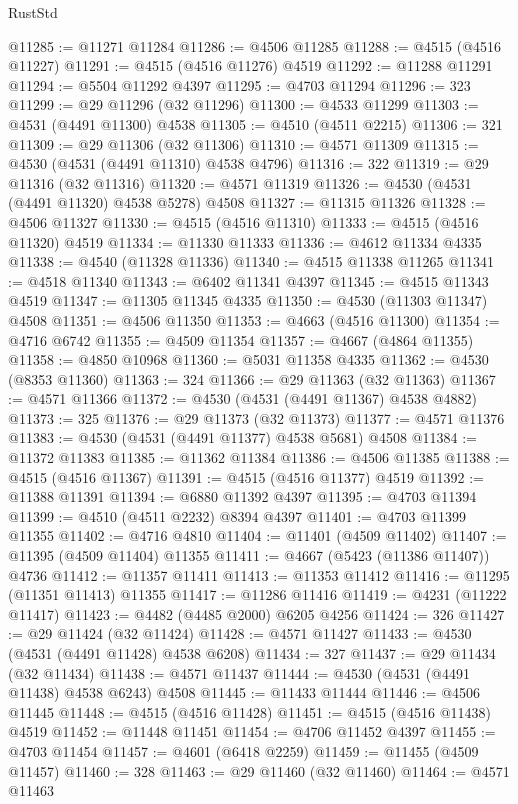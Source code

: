 \begin{lexlean}{RustStd}
\begin{coremodule}
@11285 := @11271 @11284
@11286 := @4506 @11285
@11288 := @4515 (@4516 @11227)
@11291 := @4515 (@4516 @11276) @4519
@11292 := @11288 @11291
@11294 := @5504 @11292 @4397
@11295 := @4703 @11294
@11296 := 323
@11299 := @29 @11296 (@32 @11296)
@11300 := @4533 @11299
@11303 := @4531 (@4491 @11300) @4538
@11305 := @4510 (@4511 @2215)
@11306 := 321
@11309 := @29 @11306 (@32 @11306)
@11310 := @4571 @11309
@11315 := @4530 (@4531 (@4491 @11310) @4538 @4796)
@11316 := 322
@11319 := @29 @11316 (@32 @11316)
@11320 := @4571 @11319
@11326 := @4530 (@4531 (@4491 @11320) @4538 @5278) @4508
@11327 := @11315 @11326
@11328 := @4506 @11327
@11330 := @4515 (@4516 @11310)
@11333 := @4515 (@4516 @11320) @4519
@11334 := @11330 @11333
@11336 := @4612 @11334 @4335
@11338 := @4540 (@11328 @11336)
@11340 := @4515 @11338 @11265
@11341 := @4518 @11340
@11343 := @6402 @11341 @4397
@11345 := @4515 @11343 @4519
@11347 := @11305 @11345 @4335
@11350 := @4530 (@11303 @11347) @4508
@11351 := @4506 @11350
@11353 := @4663 (@4516 @11300)
@11354 := @4716 @6742
@11355 := @4509 @11354
@11357 := @4667 (@4864 @11355)
@11358 := @4850 @10968
@11360 := @5031 @11358 @4335
@11362 := @4530 (@8353 @11360)
@11363 := 324
@11366 := @29 @11363 (@32 @11363)
@11367 := @4571 @11366
@11372 := @4530 (@4531 (@4491 @11367) @4538 @4882)
@11373 := 325
@11376 := @29 @11373 (@32 @11373)
@11377 := @4571 @11376
@11383 := @4530 (@4531 (@4491 @11377) @4538 @5681) @4508
@11384 := @11372 @11383
@11385 := @11362 @11384
@11386 := @4506 @11385
@11388 := @4515 (@4516 @11367)
@11391 := @4515 (@4516 @11377) @4519
@11392 := @11388 @11391
@11394 := @6880 @11392 @4397
@11395 := @4703 @11394
@11399 := @4510 (@4511 @2232) @8394 @4397
@11401 := @4703 @11399 @11355
@11402 := @4716 @4810
@11404 := @11401 (@4509 @11402)
@11407 := @11395 (@4509 @11404) @11355
@11411 := @4667 (@5423 (@11386 @11407)) @4736
@11412 := @11357 @11411
@11413 := @11353 @11412
@11416 := @11295 (@11351 @11413) @11355
@11417 := @11286 @11416
@11419 := @4231 (@11222 @11417)
@11423 := @4482 (@4485 @2000) @6205 @4256
@11424 := 326
@11427 := @29 @11424 (@32 @11424)
@11428 := @4571 @11427
@11433 := @4530 (@4531 (@4491 @11428) @4538 @6208)
@11434 := 327
@11437 := @29 @11434 (@32 @11434)
@11438 := @4571 @11437
@11444 := @4530 (@4531 (@4491 @11438) @4538 @6243) @4508
@11445 := @11433 @11444
@11446 := @4506 @11445
@11448 := @4515 (@4516 @11428)
@11451 := @4515 (@4516 @11438) @4519
@11452 := @11448 @11451
@11454 := @4706 @11452 @4397
@11455 := @4703 @11454
@11457 := @4601 (@6418 @2259)
@11459 := @11455 (@4509 @11457)
@11460 := 328
@11463 := @29 @11460 (@32 @11460)
@11464 := @4571 @11463

\end{coremodule}
\end{lexlean}
